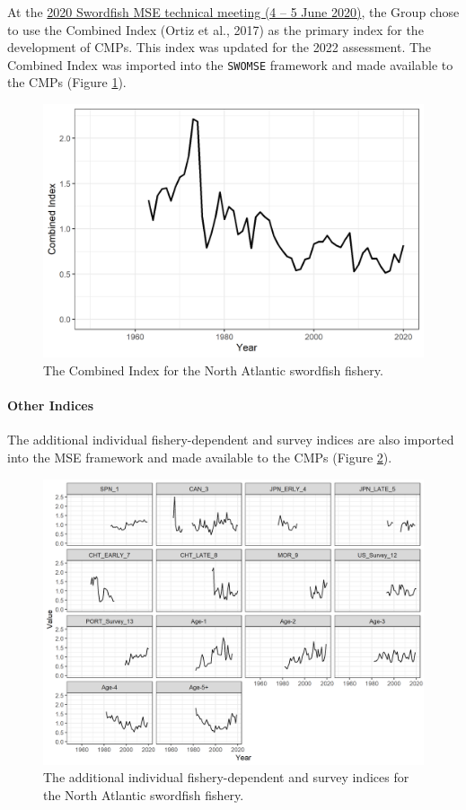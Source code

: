 \documentclass[
]{article}
\begin{document}
At the \href{./Meeting_Reports/2020_SWO_MSE_1_ENG.pdf}{2020 Swordfish MSE technical meeting (4 -- 5 June 2020)}, the Group chose to use the Combined Index (Ortiz et al., 2017) as the primary index for the development of CMPs. This index was updated for the 2022 assessment. The Combined Index was imported into the \texttt{SWOMSE} framework and made available to the CMPs (Figure \ref{fig:index-plot}).

\begin{figure}
\centering
\includegraphics{../../img/Combined_Index.png}
\caption{\label{fig:index-plot} The Combined Index for the North Atlantic swordfish fishery.}
\end{figure}

\hypertarget{other-indices}{%
\paragraph{Other Indices}\label{other-indices}}

The additional individual fishery-dependent and survey indices are also imported into the MSE framework and made available to the CMPs (Figure \ref{fig:addindex-plot}).

\begin{figure}
\centering
\includegraphics{../../img/Individual_Indices.png}
\caption{\label{fig:addindex-plot} The additional individual fishery-dependent and survey indices for the North Atlantic swordfish fishery.}
\end{figure}
\end{document}

